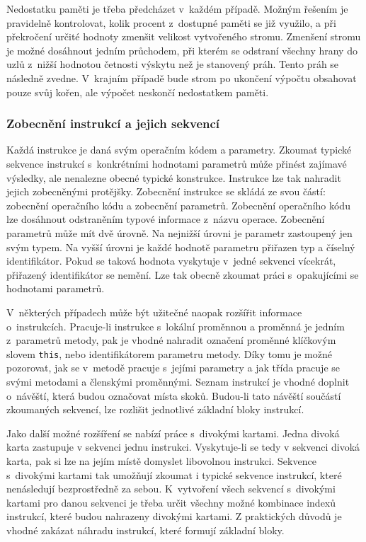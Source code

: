 Nedostatku paměti je třeba předcházet v~každém případě. Možným řešením je pravidelně kontrolovat, kolik procent z~dostupné paměti se již využilo, a při překročení určité hodnoty zmenšit velikost vytvořeného stromu. Zmenšení stromu je možné dosáhnout jedním průchodem, při kterém se odstraní všechny hrany do uzlů z~nižší hodnotou četnosti výskytu než je stanovený práh. Tento práh se následně zvedne. V~krajním případě bude strom po ukončení výpočtu obsahovat pouze svůj kořen, ale výpočet neskončí nedostatkem paměti.

\subsubsection{Zobecnění instrukcí a jejich sekvencí}

Každá instrukce je daná svým operačním kódem a parametry. Zkoumat typické sekvence instrukcí s~konkrétními hodnotami parametrů může přinést zajímavé výsledky, ale nenalezne obecné typické konstrukce. Instrukce lze tak nahradit jejich zobecněnými protějšky. Zobecnění instrukce se skládá ze svou částí: zobecnění operačního kódu a zobecnění parametrů. Zobecnění operačního kódu lze dosáhnout odstraněním typové informace z~názvu operace. Zobecnění parametrů může mít dvě úrovně. Na nejnižší úrovni je parametr zastoupený jen svým typem. Na vyšší úrovni je každé hodnotě parametru přiřazen typ a číselný identifikátor. Pokud se taková hodnota vyskytuje v~jedné sekvenci vícekrát, přiřazený identifikátor se nemění. Lze tak obecně zkoumat práci s~opakujícími se hodnotami parametrů.

V~některých případech může být užitečné naopak rozšířit informace o~instrukcích. Pracuje-li instrukce s~lokální proměnnou a proměnná je jedním z~parametrů metody, pak je vhodné nahradit označení proměnné klíčkovým slovem \texttt{this}, nebo identifikátorem parametru metody. Díky tomu je možné pozorovat, jak se v~metodě pracuje s~jejími parametry a jak třída pracuje se svými metodami a členskými proměnnými.
Seznam instrukcí je vhodné doplnit o~návěští, která budou označovat místa skoků. Budou-li tato návěští součástí zkoumaných sekvencí, lze rozlišit jednotlivé základní bloky instrukcí.

Jako další možné rozšíření se nabízí práce s~divokými kartami.
Jedna divoká karta zastupuje v sekvenci jednu instrukci. Vyskytuje-li se tedy v sekvenci divoká karta, pak si lze na jejím místě domyslet libovolnou instrukci. Sekvence s~divokými kartami tak umožňují zkoumat i typické sekvence instrukcí, které nenásledují bezprostředně za sebou. K~vytvoření všech sekvencí s~divokými kartami pro danou sekvenci je třeba určit všechny možné kombinace indexů instrukcí, které budou nahrazeny divokými kartami. Z praktických důvodů je vhodné zakázat náhradu instrukcí, které formují základní bloky.

